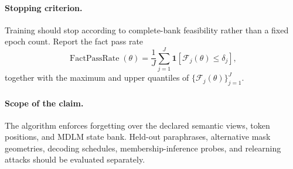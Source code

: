 \documentclass[11pt]{article}
\begin{document}
\paragraph{Stopping criterion.}
Training should stop according to complete-bank feasibility rather than a fixed epoch count. Report the fact pass rate
\begin{equation}
    \operatorname{FactPassRate}(\theta)
    = \frac{1}{J}
      \sum_{j=1}^{J}
      \mathbf{1}\!\left[\mathcal{F}_j(\theta)\leq\delta_j\right],
\end{equation}
together with the maximum and upper quantiles of $\{\mathcal{F}_j(\theta)\}_{j=1}^{J}$.

\paragraph{Scope of the claim.}
The algorithm enforces forgetting over the declared semantic views, token positions, and MDLM state bank. Held-out paraphrases, alternative mask geometries, decoding schedules, membership-inference probes, and relearning attacks should be evaluated separately.
\end{document}
